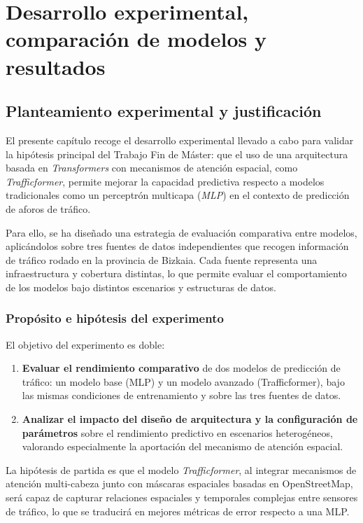\section{Desarrollo experimental, comparación de modelos y resultados}
\label{sec:desarrollo_comp_results}

\subsection{Planteamiento experimental y justificación}
\label{sec:planteamiento_experimental}

El presente capítulo recoge el desarrollo experimental llevado a cabo para validar la hipótesis principal del Trabajo Fin de Máster: que el uso de una arquitectura basada en \textit{Transformers} con mecanismos de atención espacial, como \textit{Trafficformer}, permite mejorar la capacidad predictiva respecto a modelos tradicionales como un perceptrón multicapa (\textit{MLP}) en el contexto de predicción de aforos de tráfico.

Para ello, se ha diseñado una estrategia de evaluación comparativa entre modelos, aplicándolos sobre tres fuentes de datos independientes que recogen información de tráfico rodado en la provincia de Bizkaia. Cada fuente representa una infraestructura y cobertura distintas, lo que permite evaluar el comportamiento de los modelos bajo distintos escenarios y estructuras de datos.

\subsubsection*{Propósito e hipótesis del experimento}

El objetivo del experimento es doble:

\begin{enumerate}
	\item \textbf{Evaluar el rendimiento comparativo} de dos modelos de predicción de tráfico: un modelo base (MLP) y un modelo avanzado (Trafficformer), bajo las mismas condiciones de entrenamiento y sobre las tres fuentes de datos.
	\item \textbf{Analizar el impacto del diseño de arquitectura y la configuración de parámetros} sobre el rendimiento predictivo en escenarios heterogéneos, valorando especialmente la aportación del mecanismo de atención espacial.
\end{enumerate}

La hipótesis de partida es que el modelo \textit{Trafficformer}, al integrar mecanismos de atención multi-cabeza junto con máscaras espaciales basadas en OpenStreetMap, será capaz de capturar relaciones espaciales y temporales complejas entre sensores de tráfico, lo que se traducirá en mejores métricas de error respecto a una MLP.

